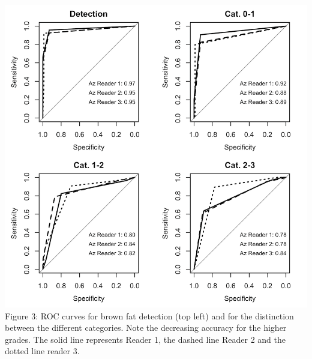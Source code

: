 \documentclass[]{elsarticle} %
\makeatletter
\def\maxwidth{\ifdim\Gin@nat@width>\linewidth\linewidth
\else\Gin@nat@width\fi}
\let\Oldincludegraphics\includegraphics
\renewcommand{\includegraphics}[1]{\Oldincludegraphics[width=\maxwidth]{#1}}
\makeatother
\begin{document}
\includegraphics{Figure_ROC.png} Figure 3: ROC curves for brown fat
detection (top left) and for the distinction between the different
categories. Note the decreasing accuracy for the higher grades. The
solid line represents Reader 1, the dashed line Reader 2 and the dotted
line reader 3.

\pagebreak
\end{document}

